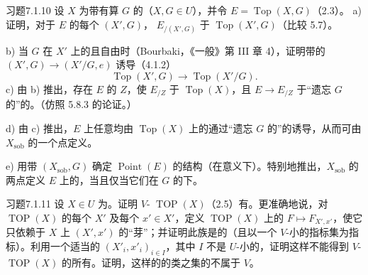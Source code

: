 \begin{SGAresult}{习题}{7.1.10}
设 $X$ 为带有算 $G$ 的（$X,G\in U$），并令 $E=\operatorname{Top}(X,G)$（2.3）。
 a) 证明，对于 $E$ 的每个 $(X',G)$， $E_{/(X',G)}$ 于 $\operatorname{Top}(X',G)$（比较 5.7）。

 b) 当 $G$ 在 $X'$ 上的且自由时（Bourbaki，《一般》第 III 章 4），证明带的 $(X',G)\to(X'/G,e)$ 诱导（4.1.2）
\[\operatorname{Top}(X',G)\longrightarrow\operatorname{Top}(X'/G).\]
 c) 由 b) 推出，存在 $E$ 的 $Z$，使 $E_{/Z}$ 于 $\operatorname{Top}(X)$，且 $E\to E_{/Z}$ 于“遗忘 $G$ 的”的。（仿照 5.8.3 的论证。）

 d) 由 c) 推出，$E$ 上任意均由 $\operatorname{Top}(X)$ 上的通过“遗忘 $G$ 的”的诱导，从而可由 $X_{\mathrm{sob}}$ 的一个点定义。

 e) 用带 $(X_{\mathrm{sob}},G)$ 确定 $\operatorname{Point}(E)$ 的结构（在意义下）。特别地推出，$X_{\mathrm{sob}}$ 的两点定义 $E$ 上的，当且仅当它们在 $G$ 的下。
\end{SGAresult}

\begin{SGAresult}{习题}{7.1.11}
设 $X\in U$ 为。证明 $V$- $\operatorname{TOP}(X)$（2.5）有。更准确地说，对 $\operatorname{TOP}(X)$ 的每个 $X'$ 及每个 $x'\in X'$，定义 $\operatorname{TOP}(X)$ 上的 $F\mapsto F_{X',x'}$，使它只依赖于 $X$ 上 $(X',x')$ 的“芽”；并证明此族是的（且以一个 $V$-小的指标集为指标）。利用一个适当的 $(X'_i,x'_i)_{i\in I}$，其中 $I$ 不是 $U$-小的，证明这样不能得到 $V$- $\operatorname{TOP}(X)$ 的所有。证明，这样的的类之集的不属于 $V$。
\end{SGAresult}

